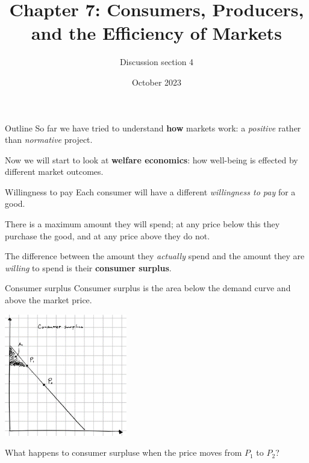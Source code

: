 \documentclass[aspectratio=169]{beamer}
\title{Chapter 7: Consumers, Producers, and the Efficiency of Markets}
\author{Discussion section 4}
\date{October 2023}
\begin{document}
\begin{frame}
    \titlepage 
\end{frame}

\begin{frame}{Outline}
    So far we have tried to understand \textbf{how} markets work: a \textit{positive} rather than \textit{normative} project.

    \vspace{5mm}

    Now we will start to look at \textbf{welfare economics}: how well-being is effected by different market outcomes.
\end{frame}

\begin{frame}{Willingness to pay}
    Each consumer will have a different \textit{willingness to pay} for a good.
    
    \vspace{2mm}

    There is a maximum amount they will spend; at any price below this they purchase the good, and at any price above they do not.

    \vspace{2mm}

    The difference between the amount they \textit{actually} spend and the amount they are \textit{willing} to spend is their \textbf{consumer surplus}.

\end{frame}

\begin{frame}{Consumer surplus}
    Consumer surplus is the area below the demand curve and above the market price.

    \centering
    \includegraphics[width = 0.4\textwidth,keepaspectratio]{../figs/surplus1.png}

    What happens to consumer surpluse when the price moves from $P_1$ to $P_2$?
\end{frame}
\end{document}

